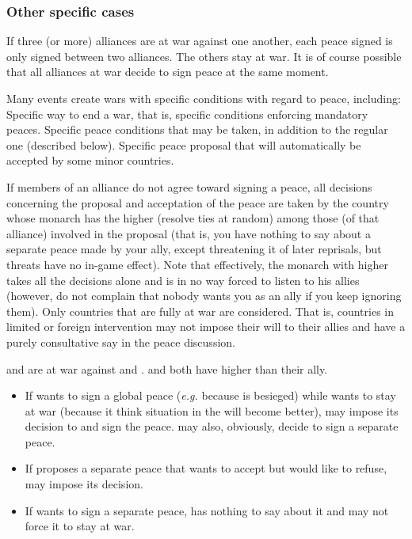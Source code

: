\subsubsection{Other specific cases}
\bparag If three (or more) alliances are at war against one another, each
peace signed is only signed between two alliances. The others stay at war.
\bparag It is of course possible that all alliances at war decide to sign
peace at the same moment.

 Many events create wars with specific conditions
with regard to peace, including:
\bparag Specific way to end a war, that is, specific conditions enforcing
mandatory peaces.
\bparag Specific peace conditions that may be taken, in addition to the
regular one (described below).
\bparag Specific peace proposal that will automatically be accepted by some
minor countries.

\aparag[Disagreements]
\bparag If members of an alliance do not agree toward signing a peace, all
decisions concerning the proposal and acceptation of the peace are taken by
the country whose monarch has the higher \DIP (resolve ties at random) among
those (of that alliance) involved in the proposal (that is, you have nothing
to say about a separate peace made by your ally, except threatening it of
later reprisals, but threats have no in-game effect).
\bparag Note that effectively, the monarch with higher \DIP takes all the
decisions alone and is in no way forced to listen to his allies (however, do
not complain that nobody wants you as an ally if you keep ignoring them).
\bparag Only countries that are fully at war are considered. That is,
countries in limited or foreign intervention may not impose their will to
their allies and have a purely consultative say in the peace discussion. 

\begin{exemple}[Disagreements]
  \FRA and \SPA are at war against \HOL and \ANG. \FRA and  \HOL both have
  higher \DIP than their ally.
  \begin{itemize}
  \item If \HOL wants to sign a global peace (\emph{e.g.} because
    \villeAmsterdam is besieged) while \ANG wants to stay at war (because it
    think situation in the \ROTW will become better), \HOL may impose its
    decision to \ANG and sign the peace. \HOL may also, obviously, decide to
    sign a separate peace.
  \item If \HOL proposes a separate peace that \FRA wants to accept but \HIS
    would like to refuse, \FRA may impose its decision.
  \item If \ANG wants to sign a separate peace, \HOL has nothing to say about
    it and may not force it to stay at war.
  \end{itemize}
\end{exemple}

